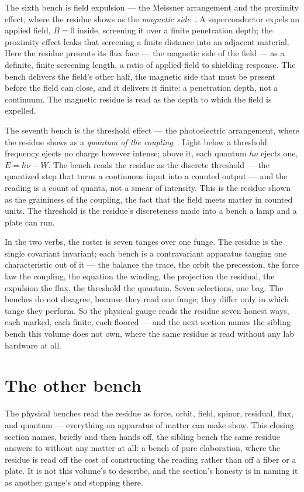 The sixth bench is field expulsion --- the Meissner arrangement and the proximity effect, where the residue shows as the
\emph{magnetic side}~\cite{meissner1933}. A superconductor expels an applied field, $B = 0$ inside, screening it over a
finite penetration depth; the proximity effect leaks that screening a finite distance into an adjacent material. Here the
residue presents its flux face --- the magnetic side of the field --- as a definite, finite screening length, a ratio of
applied field to shielding response. The bench delivers the field's other half, the magnetic side that must be present before
the field can close, and it delivers it finite: a penetration depth, not a continuum. The magnetic residue is read as the
depth to which the field is expelled.

The seventh bench is the threshold effect --- the photoelectric arrangement, where the residue shows as a \emph{quantum of
the coupling}~\cite{planck1901,planck1900}. Light below a threshold frequency ejects no charge however intense; above it,
each quantum $h\nu$ ejects one, $E = h\nu - W$. The bench reads the residue as the discrete threshold --- the quantized step
that turns a continuous input into a counted output --- and the reading is a count of quanta, not a smear of intensity. This
is the residue shown as the graininess of the coupling, the fact that the field meets matter in counted units. The threshold
is the residue's discreteness made into a bench a lamp and a plate can run.

In the two verbs, the roster is seven tanges over one funge. The residue is the single covariant invariant; each bench is a
contravariant apparatus tanging one characteristic out of it --- the balance the trace, the orbit the precession, the force
law the coupling, the equation the winding, the projection the residual, the expulsion the flux, the threshold the quantum.
Seven selections, one bag. The benches do not disagree, because they read one funge; they differ only in which tange they
perform. So the physical gauge reads the residue seven honest ways, each marked, each finite, each floored --- and the next
section names the sibling bench this volume does not own, where the same residue is read without any lab hardware at all.

\section{The other bench}

The physical benches read the residue as force, orbit, field, spinor, residual, flux, and quantum --- everything an apparatus
of matter can make show. This closing section names, briefly and then hands off, the sibling bench the same residue answers
to without any matter at all: a bench of pure elaboration, where the residue is read off the cost of constructing the reading
rather than off a fiber or a plate. It is not this volume's to describe, and the section's honesty is in naming it as another
gauge's and stopping there.

